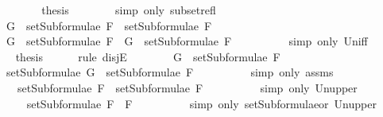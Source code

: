 \begin{isabellebody}
\ \ \ \ \isamarkupfalse%
\ \isamarkupfalse%
\ {\isacharquery}thesis\isanewline
\ \ \ \ \ \ \isamarkupfalse%
\ {\isacharparenleft}simp\ only{\isacharcolon}\ subset{\isacharunderscore}refl{\isacharparenright}\isanewline
\ \ \isamarkupfalse%
\isanewline
\ \ \ \ \isamarkupfalse%
\ {\isachardoublequoteopen}G\ {\isasymin}\ setSubformulae\ F{}\ {\isasymunion}\ setSubformulae\ F{}{\isachardoublequoteclose}\isanewline
\ \ \ \ \isamarkupfalse%
\ \isamarkupfalse%
\ {\isachardoublequoteopen}G\ {\isasymin}\ setSubformulae\ F{}\ {\isasymor}\ G\ {\isasymin}\ setSubformulae\ F{}{\isachardoublequoteclose}\ \ \isanewline
\ \ \ \ \ \ \isamarkupfalse%
\ {\isacharparenleft}simp\ only{\isacharcolon}\ Un{\isacharunderscore}iff{\isacharparenright}\isanewline
\ \ \ \ \isamarkupfalse%
\ \isamarkupfalse%
\ {\isacharquery}thesis\isanewline
\ \ \ \ \isamarkupfalse%
\ {\isacharparenleft}rule\ disjE{\isacharparenright}\isanewline
\ \ \ \ \ \ \isamarkupfalse%
\ {\isachardoublequoteopen}G\ {\isasymin}\ setSubformulae\ F{}{\isachardoublequoteclose}\isanewline
\ \ \ \ \ \ \isamarkupfalse%
\ \isamarkupfalse%
\ {\isachardoublequoteopen}setSubformulae\ G\ {\isasymsubseteq}\ setSubformulae\ F{}{\isachardoublequoteclose}\isanewline
\ \ \ \ \ \ \ \ \isamarkupfalse%
\ {\isacharparenleft}simp\ only{\isacharcolon}\ assms{\isacharparenleft}{}{\isacharparenright}{\isacharparenright}\isanewline
\ \ \ \ \ \ \isamarkupfalse%
\ \isamarkupfalse%
\ {\isachardoublequoteopen}{\isasymdots}\ {\isasymsubseteq}\ setSubformulae\ F{}\ {\isasymunion}\ setSubformulae\ F{}{\isachardoublequoteclose}\isanewline
\ \ \ \ \ \ \ \ \isamarkupfalse%
\ {\isacharparenleft}simp\ only{\isacharcolon}\ Un{\isacharunderscore}upper{}{\isacharparenright}\isanewline
\ \ \ \ \ \ \isamarkupfalse%
\ \isamarkupfalse%
\ {\isachardoublequoteopen}{\isasymdots}\ {\isasymsubseteq}\ setSubformulae\ {\isacharparenleft}F{}\ \isactrlbold {\isasymor}\ F{}{\isacharparenright}{\isachardoublequoteclose}\isanewline
\ \ \ \ \ \ \ \ \isamarkupfalse%
\ {\isacharparenleft}simp\ only{\isacharcolon}\ setSubformulae{\isacharunderscore}or\ Un{\isacharunderscore}upper{}{\isacharparenright}\isanewline

\end{isabellebody}
